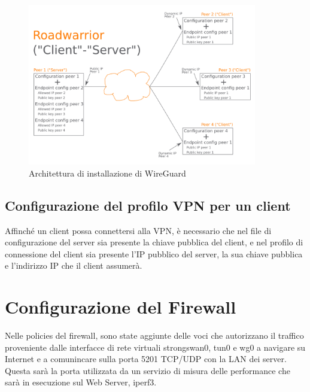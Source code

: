 \begin{figure}[ht]
    \centering
    \includegraphics[width=10cm]{figure/Wireguard-roadwarrior.png}
    \caption{Architettura di installazione di WireGuard}
\end{figure}


\subsection{Configurazione del profilo VPN per un client}
Affinché un client possa connettersi alla VPN, è necessario che nel file di configurazione del server sia presente la chiave pubblica del client, e nel profilo di connessione del client sia presente l'IP pubblico del server, la sua chiave pubblica e l'indirizzo IP che il client assumerà.

\section{Configurazione del Firewall}
Nelle policies del firewall, sono state aggiunte delle voci che autorizzano il traffico proveniente dalle interfacce di rete virtuali strongswan0, tun0 e wg0 a navigare su Internet e a comunincare sulla porta 5201 TCP/UDP con la LAN dei server. Questa sarà la porta utilizzata da un servizio di misura delle performance che sarà in esecuzione sul Web Server, iperf3.